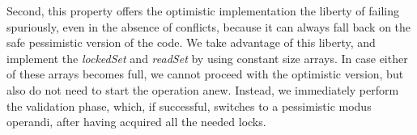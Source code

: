 Second, this property offers the optimistic implementation the liberty of
failing spuriously, even in the absence of conflicts, because it can always fall back on the safe pessimistic version
of the code.
We take advantage of this liberty, and implement the \emph{lockedSet} and \emph{readSet} by using constant size arrays.
In case either of these arrays becomes full, we cannot proceed with the optimistic version, but also
do not need to start the operation anew.
Instead, we immediately perform the validation phase, which, if successful, switches to a pessimistic modus operandi, after having acquired all the needed locks.
